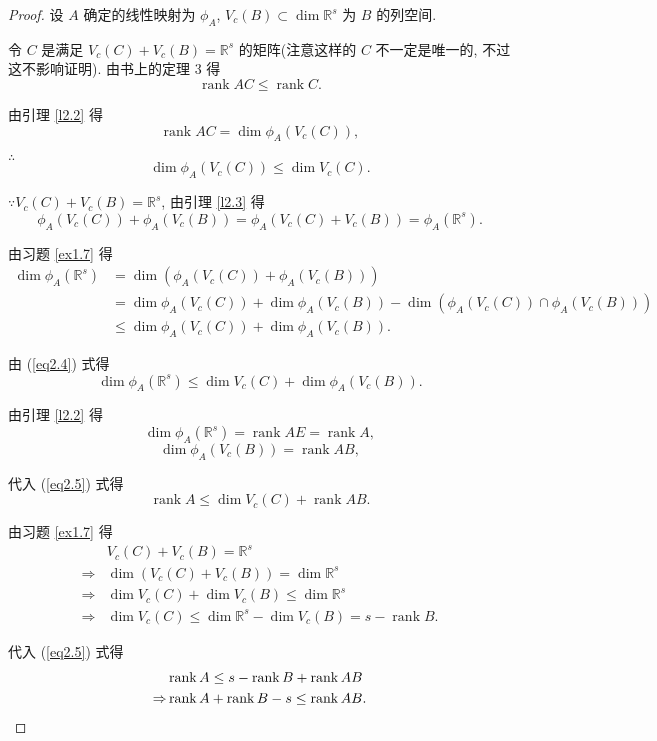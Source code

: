 \documentclass{ctexart}
\begin{document}
\begin{proof}
    设 $A$ 确定的线性映射为 $\phi_A$, $V_c(B)\subset\dim\mathbb{R}^s$ 为 $B$ 的列空间.

    令 $C$ 是满足 $V_c(C)+V_c(B)=\mathbb{R}^s$ 的矩阵(注意这样的 $C$ 不一定是唯一的, 不过这不影响证明). 由书上的定理 3 得
    \[\operatorname{rank}AC\leq\operatorname{rank}C.\]

    由引理 \ref{l2.2} 得
    \[\operatorname{rank}AC=\dim\phi_A(V_c(C)),\]

    $\therefore$
    \begin{equation}\label{eq2.4}
        \dim\phi_A(V_c(C))\leq\dim V_c(C).
    \end{equation}

    $\because V_c(C)+V_c(B)=\mathbb{R}^s$, 由引理 \ref{l2.3} 得
    \[\phi_A(V_c(C))+\phi_A(V_c(B))=\phi_A(V_c(C)+V_c(B))=\phi_A(\mathbb{R}^s).\]

    由习题 \ref{ex1.7} 得
    \begin{align*}
        \dim\phi_A(\mathbb{R}^s) & =\dim(\phi_A(V_c(C))+\phi_A(V_c(B))) \\
        & =\dim\phi_A(V_c(C))+\dim\phi_A(V_c(B))-\dim(\phi_A(V_c(C))\cap\phi_A(V_c(B))) \\
        & \leq\dim\phi_A(V_c(C))+\dim\phi_A(V_c(B)).
    \end{align*}

    由 (\ref{eq2.4}) 式得
    \begin{equation}\label{eq2.5}
        \dim\phi_A(\mathbb{R}^s)\leq\dim V_c(C)+\dim\phi_A(V_c(B)).
    \end{equation}

    由引理 \ref{l2.2} 得
    \[\dim\phi_A(\mathbb{R}^s)=\operatorname{rank}AE=\operatorname{rank}A,\]
    \[\dim\phi_A(V_c(B))=\operatorname{rank}AB,\]

    代入 (\ref{eq2.5}) 式得
    \begin{equation}
        \operatorname{rank}A\leq\dim V_c(C)+\operatorname{rank}AB.
    \end{equation}

    由习题 \ref{ex1.7} 得
    \begin{align*}
        & V_c(C)+V_c(B)=\mathbb{R}^s \\
        \Rightarrow & \dim (V_c(C)+V_c(B))=\dim\mathbb{R}^s \\
        \Rightarrow & \dim V_c(C)+\dim V_c(B)\leq\dim\mathbb{R}^s \\
        \Rightarrow & \dim V_c(C)\leq\dim\mathbb{R}^s-\dim V_c(B)=s-\operatorname{rank}B.
    \end{align*}

    代入 (\ref{eq2.5}) 式得
    \begin{align*}
        & \operatorname{rank}A\leq s-\operatorname{rank}B+\operatorname{rank}AB \\
        \Rightarrow & \operatorname{rank}A+\operatorname{rank}B-s\leq\operatorname{rank}AB.\qedhere
    \end{align*}
\end{proof}
\end{document}
